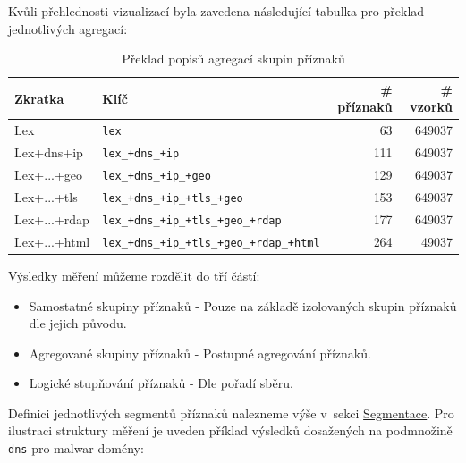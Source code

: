 Kvůli přehlednosti vizualizací byla zavedena následující tabulka pro překlad jednotlivých agregací:


\begin{table}[ht]
  \centering

  \begin{tabular}{|l|l|r|r|}
    \toprule
    Zkratka & Klíč & \# příznaků & \# vzorků \\
    \midrule
    Lex & \texttt{lex} & 63 & 649037 \\
    Lex+dns+ip & \texttt{lex\_+dns\_+ip} & 111 & 649037 \\
    Lex+...+geo & \texttt{lex\_+dns\_+ip\_+geo} & 129 & 649037 \\
    Lex+...+tls & \texttt{lex\_+dns\_+ip\_+tls\_+geo} & 153 & 649037 \\
    Lex+...+rdap & \texttt{lex\_+dns\_+ip\_+tls\_+geo\_+rdap} & 177 & 649037 \\
    Lex+...+html & \texttt{lex\_+dns\_+ip\_+tls\_+geo\_+rdap\_+html} & 264 & 49037 \\
    \bottomrule
  \end{tabular}
    \caption{Překlad popisů agregací skupin příznaků}
  \label{tab:subset-lookup}
\end{table}


\noindent Výsledky měření můžeme rozdělit do tří částí:
\begin{itemize}
    \item Samostatné skupiny příznaků - Pouze na základě izolovaných skupin příznaků dle jejich původu.  
    \item Agregované skupiny příznaků - Postupné agregování příznaků. 
    \item Logické stupňování příznaků - Dle pořadí sběru. 
\end{itemize}

\noindent Definici jednotlivých segmentů příznaků nalezneme výše v~sekci \hyperref[item:segment]{Segmentace}. Pro ilustraci struktury měření je uveden příklad výsledků dosažených na podmnožině \texttt{dns} pro malwar domény:

